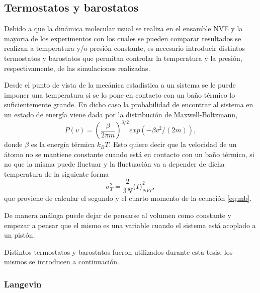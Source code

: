 \subsection{Termostatos y barostatos}

Debido a que la dinámica molecular usual se realiza en el ensamble NVE y la 
mayoria de los experimentos con los cuales se pueden comparar resultados se 
realizan a temperatura y/o presión constante, es necesario introducir distintos
termostatos y barostatos que permitan controlar la temperatura y la presión,
respectivamente, de las simulaciones realizadas. 

Desde el punto de vista de la mecánica estadística a un sistema se le puede 
imponer una temperatura si se lo pone en contacto con un baño térmico lo 
suficientemente grande. En dicho caso la probabilidad de encontrar al sistema en
un estado de energía viene dada por la distribución de Maxwell-Boltzmann,
\begin{equation}\label{eq:mb}
P(v) = \left( \frac{\beta}{2\pi m} \right)^{3/2} exp(-\beta v^2 / (2m)),
\end{equation}
donde $\beta$ es la energía térmica $k_BT$. Esto quiere decir que la velocidad de
un átomo no se mantiene constante cuando está en contacto con un baño térmico, si 
no que la misma puede fluctuar y la fluctuación va a depender de dicha temperatura
de la siguiente forma
$$
\sigma_T^2 = \frac{2}{3 N} \langle T \rangle_{NVT}^2,
$$
que proviene de calcular el segundo y el cuarto momento de la ecuación \ref{eq:mb}.

De manera análoga puede dejar de pensarse al volumen como constante y empezar a
pensar que el mismo es una variable cuando el sistema está acoplado a un pistón.

Distintos termostatos y barostatos fueron utilizados durante esta tesis, los mismos 
se introducen a continuación.

\subsubsection{Langevin}

